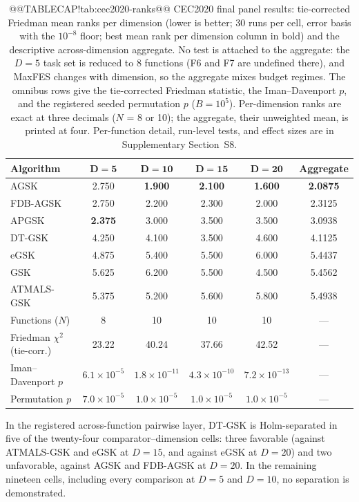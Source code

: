 \documentclass[10pt,a4paper]{article}
\newcommand{\dtgsk}{DT-GSK}
\newcommand{\atmals}{ATMALS-GSK}
\newcommand{\agsk}{AGSK}
\newcommand{\apgsk}{APGSK}
\newcommand{\fdbagsk}{FDB-AGSK}
\newcommand{\egsk}{eGSK}
\newcommand{\bestval}[1]{\textbf{#1}}
\begin{document}
\begin{table}[H]
\caption{@@TABLECAP!tab:cec2020-ranks@@ CEC2020 final panel results: tie-corrected Friedman mean ranks per
dimension (lower is better; 30 runs per cell, error basis with the $10^{-8}$
floor; best mean rank per dimension column in bold) and the descriptive
across-dimension aggregate. No test is attached to
the aggregate: the $D=5$ task set is reduced to 8 functions (F6 and F7 are
undefined there), and MaxFES changes with dimension, so the aggregate mixes
budget regimes. The omnibus rows give the tie-corrected Friedman statistic,
the Iman--Davenport $p$, and the registered seeded permutation $p$
($B = 10^{5}$). Per-dimension ranks are exact at three decimals ($N$ = 8 or
10); the aggregate, their unweighted mean, is printed at four. Per-function
detail, run-level tests, and effect sizes are in Supplementary
Section~S8.}\label{tab:cec2020-ranks}
\setlength{\tabcolsep}{5pt}
\begin{tabular}{lccccc}
\toprule
\textbf{Algorithm} & $\bm{D=5}$ & $\bm{D=10}$ & $\bm{D=15}$ & $\bm{D=20}$ & \textbf{Aggregate} \\
\midrule
\agsk{} & 2.750 & \bestval{1.900} & \bestval{2.100} & \bestval{1.600} & \bestval{2.0875} \\
\fdbagsk{} & 2.750 & 2.200 & 2.300 & 2.000 & 2.3125 \\
\apgsk{} & \bestval{2.375} & 3.000 & 3.500 & 3.500 & 3.0938 \\
\dtgsk{} & 4.250 & 4.100 & 3.500 & 4.600 & 4.1125 \\
\egsk{} & 4.875 & 5.400 & 5.500 & 6.000 & 5.4437 \\
GSK & 5.625 & 6.200 & 5.500 & 4.500 & 5.4562 \\
\atmals{} & 5.375 & 5.200 & 5.600 & 5.800 & 5.4938 \\
\midrule
Functions ($N$) & 8 & 10 & 10 & 10 & --- \\
Friedman $\chi^{2}$ (tie-corr.) & 23.22 & 40.24 & 37.66 & 42.52 & --- \\
Iman--Davenport $p$ & $6.1\times10^{-5}$ & $1.8\times10^{-11}$ & $4.3\times10^{-10}$ & $7.2\times10^{-13}$ & --- \\
Permutation $p$ & $7.0\times10^{-5}$ & $1.0\times10^{-5}$ & $1.0\times10^{-5}$ & $1.0\times10^{-5}$ & --- \\
\bottomrule
\end{tabular}





\end{table}
In the registered across-function pairwise layer, \dtgsk{} is
Holm-separated in five of the twenty-four comparator--dimension cells:
three favorable (against \atmals{} and \egsk{} at $D = 15$, and
against \egsk{} at $D = 20$) and two unfavorable, against \agsk{}
and \fdbagsk{} at $D = 20$. In the remaining nineteen cells, including
every comparison at $D = 5$ and $D = 10$, no separation is demonstrated.
\end{document}

